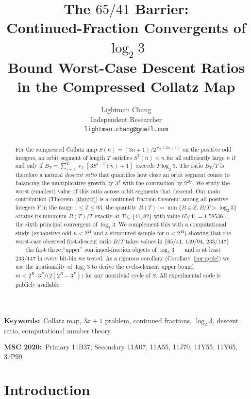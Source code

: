 \documentclass[11pt,a4paper]{article}
\title{\Large The $65/41$ Barrier:\\
Continued-Fraction Convergents of $\log_2 3$\\
Bound Worst-Case Descent Ratios\\[4pt]
\large in the Compressed Collatz Map}
\author{Lightman Chang\\
Independent Researcher\\
\texttt{lightman.chang@gmail.com}}
\date{}
\theoremstyle{definition}
\theoremstyle{remark}
\DeclareMathOperator{\val}{v}
\newcommand{\Z}{\mathbb{Z}}
\begin{document}
\maketitle

\begin{abstract}
For the compressed Collatz map $S(n) = (3n+1)/2^{\val_2(3n+1)}$ on the
positive odd integers, an orbit segment of length $T$ satisfies
$S^T(n) < n$ for all sufficiently large $n$ if and only if
$B_T = \sum_{i=1}^{T} \val_2(3 S^{i-1}(n) + 1)$ exceeds $T \log_2 3$.
The ratio $B_T / T$ is therefore a natural \emph{descent ratio} that
quantifies how close an orbit segment comes to balancing the
multiplicative growth by $3^T$ with the contraction by $2^{B_T}$.
We study the worst (smallest) value of this ratio across orbit segments
that descend.  Our main contribution (Theorem~\ref{thm:cf})
is a continued-fraction theorem: among all positive integers $T$ in the
range $1 \leq T \leq 93$, the quantity
$B(T) := \min\{B \in \Z : B/T > \log_2 3\}$ attains its minimum
$B(T)/T$ exactly at $T \in \{41, 82\}$ with value $65/41 = 1.58536\ldots$,
the sixth principal convergent of $\log_2 3$.  We complement this with a
computational study (exhaustive odd $n < 2^{21}$ and a structured sample
for $n < 2^{44}$) showing that the worst-case observed first-descent
ratio $B/T$ takes values in $\{65/41,\, 149/94,\, 233/147\}$~--- the
first three ``upper'' continued-fraction objects of $\log_2 3$~--- and
is at least $233/147$ in every bit-bin we tested.  As a rigorous
corollary (Corollary~\ref{cor:cycle}) we use the irrationality of
$\log_2 3$ to derive the cycle-element upper bound
$m < 2^B \cdot 3^P / \bigl(2(2^B - 3^P)\bigr)$ for any nontrivial cycle
of $S$.  All experimental code is publicly available.
\end{abstract}

\noindent\textbf{Keywords:}~Collatz map, $3x{+}1$ problem,
continued fractions, $\log_2 3$, descent ratio, computational number
theory.

\smallskip
\noindent\textbf{MSC 2020:}~Primary 11B37; Secondary 11A07, 11A55,
11J70, 11Y55, 11Y65, 37P99.

\section{Introduction}\label{sec:intro}
\end{document}
